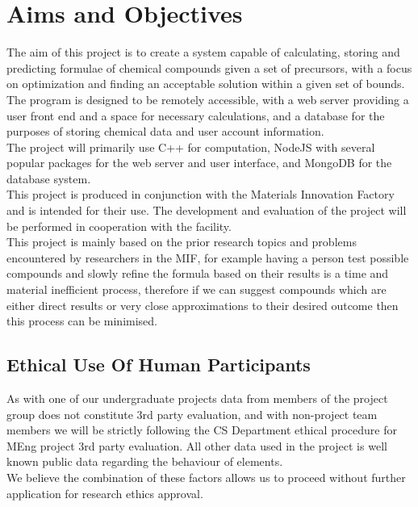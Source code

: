 \section{Aims and Objectives}
The aim of this project is to create a system capable of calculating, storing and predicting formulae of chemical compounds given a set of precursors, with a focus on optimization and finding an acceptable solution within a given set of bounds. The program is designed to be remotely accessible, with a web server providing a user front end and a space for necessary calculations, and a database for the purposes of storing chemical data and user account information. \\

The project will primarily use C++ for computation, NodeJS with several popular packages for the web server and user interface, and MongoDB for the database system. \\

This project is produced in conjunction with the Materials Innovation Factory and is intended for their use. The development and evaluation of the project will be performed in cooperation with the facility. \\

This project is mainly based on the prior research topics and problems encountered by researchers in the MIF, for example having a person test possible compounds and slowly refine the formula based on their results is a time and material inefficient process, therefore if we can suggest compounds which are either direct results or very close approximations to their desired outcome then this process can be minimised. \\

\subsection{Ethical Use Of Human Participants}
As with one of our undergraduate projects data from members of the project group does not constitute 3rd party evaluation, and with non-project team members we will be strictly following the CS Department ethical procedure for MEng project 3rd party evaluation. All other data used in the project is well known public data regarding the behaviour of elements. \\

We believe the combination of these factors allows us to proceed without further application for research ethics approval.
